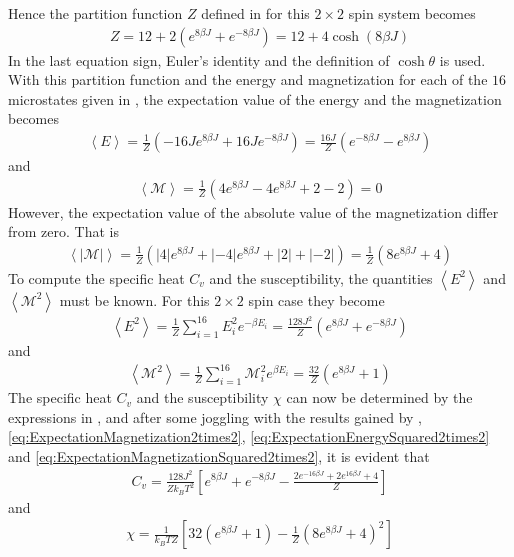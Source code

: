 Hence the partition function $Z$ defined in  for this $2\times 2$ spin system becomes
\begin{align}
	Z = 12 + 2\left( e^{8\beta J} + e^{-8 \beta J} \right)
	= 12 + 4\cosh (8\beta J)
	\label{eq:PartitionFunction2times2}
\end{align}
In the last equation sign, Euler's identity  and the definition of $\cosh \theta$ is used.
With this partition function and the energy and magnetization for each of the $16$ microstates given in , the expectation value of the energy and the magnetization becomes
\begin{align}
	\left< E \right> = \frac{1}{Z} (-16 J e^{8\beta J} + 16 J e^{-8\beta J} )
	 = \frac{16J}{Z} (e^{-8\beta J}-e^{8\beta J})
	 \label{eq:ExpectationEnergy2times2}
\end{align} 
and
\begin{align}
	\left< \mathcal{M} \right> = \frac{1}{Z} (4e^{8\beta J} -4e^{8\beta J} +2 -2 ) = 0 
	\label{eq:ExpectationMagnetization2times2}
\end{align}
However, the expectation value of the absolute value of the magnetization differ from zero. 
That is
\begin{align}
	\left< | \mathcal{M} | \right> = \frac{1}{Z} \left( |4|e^{8\beta J} + |-4|e^{8\beta J} +|2| + |-2| \right) = 
	\frac{1}{Z} ( 8 e^{8\beta J} + 4 ) 
\end{align}
To compute the specific heat $C_v$ and the susceptibility, the quantities $\left< E^2 \right>$ and $\left< \mathcal{M}^2 \right>$ must be known.
For this $2\times 2$ spin case they become
\begin{align}
	\left< E^2 \right> = \frac{1}{Z} \sum _{i=1} ^{16} E_i ^2 e^{-\beta E_i}
	= \frac{128 J^2}{Z} (e^{8\beta J} + e^{-8\beta J} ) 
	\label{eq:ExpectationEnergySquared2times2}
\end{align}
and 
\begin{align}
	\left< \mathcal{M}^2 \right> = \frac{1}{Z} \sum _{i=1} ^{16} \mathcal{M}_i ^2 e^{\beta E_i}
	= \frac{32}{Z} (e^{8\beta J} + 1 ) 
	\label{eq:ExpectationMagnetizationSquared2times2}
\end{align}
The specific heat $C_v$ and the susceptibility $\chi$ can now be determined by the expressions in , and after some joggling with the results gained by , \eqref{eq:ExpectationMagnetization2times2}, \eqref{eq:ExpectationEnergySquared2times2} and \eqref{eq:ExpectationMagnetizationSquared2times2}, it is evident that
\begin{align}
	C_v = \frac{128 J^2}{Z k_B T^2} \left[ e^{8\beta J} + e^{-8\beta J} - \frac{2e^{-16\beta J}+2e^{16\beta J}+4}{Z} \right]
	\label{eq:SpecificHeat2times2}
\end{align}
and
\begin{align}
	\chi = \frac{1}{k_B T Z} \left[ 32(e^{8\beta J} +1) - \frac{1}{Z}\left( 8e^{8\beta J} +4 \right)^2 \right]
	\label{sec:Susceptibility2times2}
\end{align}
